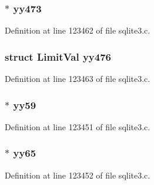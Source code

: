\subsubsection[{yy473}]{$\ast$ yy473}\label{union_y_y_m_i_n_o_r_t_y_p_e_a5fce8250dff3b187e37570cebf5b8c70}


Definition at line 123462 of file sqlite3.\+c.

\hypertarget{union_y_y_m_i_n_o_r_t_y_p_e_a7af5b42cf17e32bd00adf929862a0a9d}{}
\subsubsection[{yy476}]{\setlength{\rightskip}{0pt plus 5cm}struct {\bf Limit\+Val} yy476}\label{union_y_y_m_i_n_o_r_t_y_p_e_a7af5b42cf17e32bd00adf929862a0a9d}


Definition at line 123463 of file sqlite3.\+c.

\hypertarget{union_y_y_m_i_n_o_r_t_y_p_e_a2daac3ebedf88fcb7e00c0a723e3f8b8}{}
\subsubsection[{yy59}]{$\ast$ yy59}\label{union_y_y_m_i_n_o_r_t_y_p_e_a2daac3ebedf88fcb7e00c0a723e3f8b8}


Definition at line 123451 of file sqlite3.\+c.

\hypertarget{union_y_y_m_i_n_o_r_t_y_p_e_a71a8259822c811a8fc0f1f892909122d}{}
\subsubsection[{yy65}]{$\ast$ yy65}\label{union_y_y_m_i_n_o_r_t_y_p_e_a71a8259822c811a8fc0f1f892909122d}


Definition at line 123452 of file sqlite3.\+c.

\hypertarget{union_y_y_m_i_n_o_r_t_y_p_e_a2f23d14f37b365fa5cce1bd83276b6fd}{}
